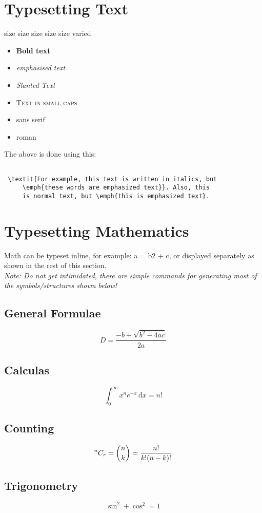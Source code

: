 \documentclass[10pt]{article}
\begin{document}
       \section{Typesetting Text}
  {\tiny size} 
   {\scriptsize size} 
    {\footnotesize size}
     {\small size}
      {\normalsize size}
{\LARGE  varied}




       \begin{itemize}
     \item \textbf{Bold text}
     \item \emph{emphasised text} 
     \item \textsl{Slanted Text}
     \item \textsc{Text in small caps}
    \item \textsf{sans serif}
         \item   \textrm{roman}
   \end{itemize}
   The above is done using this:
 \begin{verbatim}

 \textit{For example, this text is written in italics, but
	 \emph{these words are emphasized text}}. Also, this
	 is normal text, but \emph{this is emphasized text}.
\end{verbatim}	 
   \section{Typesetting Mathematics}
Math can be typeset inline, for example: a = b2 + c, or displayed separately as
shown in the rest of this section.\\
\textit{Note: Do not get intimidated, there are simple commands for generating most
	of the symbols/structures shown below!
}
   \subsection{ General Formulae}
\[
D= \frac{-b + \sqrt{b^2-4ac}}{2a}
\]
\subsection{Calculas}
\[
 \int_0^\infty x^{n}e^{-x}\,\mathrm{d}x =n!
 \]
\subsection{Counting}
\[
^nC_r={n\choose k}={n! \over k!(n-k)!}
\]
\subsection{Trigonometry}
\[
\sin^2 + \cos^2=1
\]
\end{document}
